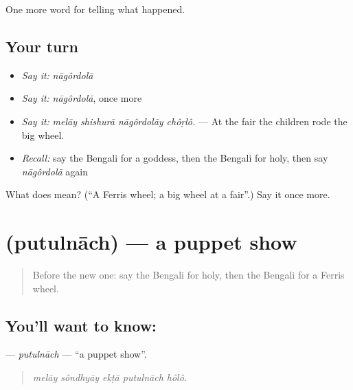 \begin{grammarlens}[title={What you've built}]
One more word for telling what happened.
\end{grammarlens}

\subsection*{Your turn}
\begin{itemize}
\raggedright
  \item \emph{Say it:} \emph{nāgôrdolā}
  \item \emph{Say it:} \emph{nāgôrdolā}, once more
  \item \emph{Say it:} \emph{melāy shishurā nāgôrdolāy chôṛlô.} — At the fair the children rode the big wheel.
  \item \emph{Recall:} say the Bengali for a goddess, then the Bengali for holy, then say \emph{nāgôrdolā} again
\end{itemize}

\begin{tcolorbox}[breakable,colback=teal!4,colframe=teal!35!black,title={Before you move on}]
What does  mean? (\textquotedblleft{}A Ferris wheel; a big wheel at a fair\textquotedblright{}.) Say it once more.
\end{tcolorbox}
\section[\texorpdfstring{\bn{পুতুলনাচ} (putulnāch)}{পুতুলনাচ (putulnāch)}]{ (putulnāch) — a puppet show}

\label{lesson:BN-C311-putulnach}



\begin{quote}
Before the new one: say the Bengali for holy, then the Bengali for a Ferris wheel.
\end{quote}

\subsection*{You'll want to know: }
\textbf{} — \emph{putulnāch} — \textquotedblleft{}a puppet show\textquotedblright{}.

\begin{quote}
    
\end{quote}

\begin{quote}
\emph{melāy sôndhyāy ekṭā putulnāch hôlô.}
\end{quote}

